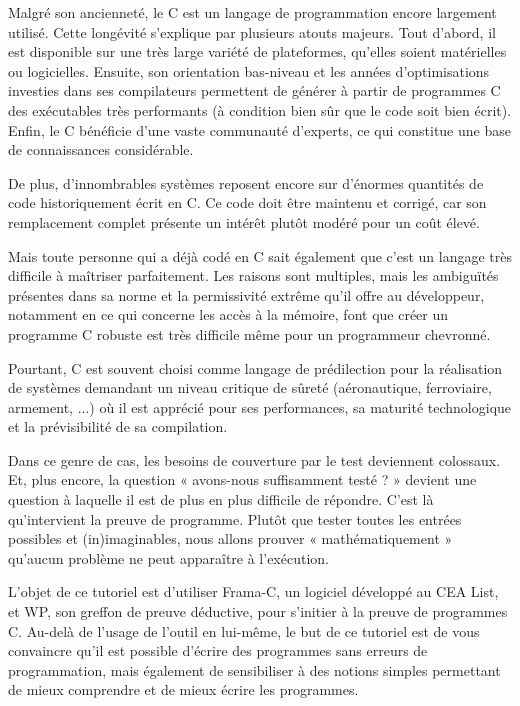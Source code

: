 \newpage


Malgré son ancienneté, le C est un langage de programmation encore largement
utilisé.  Cette longévité s’explique par plusieurs atouts majeurs. Tout d’abord,
il est disponible sur une très large variété de plateformes, qu’elles soient
matérielles ou logicielles. Ensuite, son orientation bas-niveau et les années
d'optimisations investies dans ses compilateurs permettent de générer à
partir de programmes C des exécutables très performants (à condition bien sûr
que le code soit bien écrit). Enfin, le C bénéficie d’une vaste communauté
d’experts, ce qui constitue une base de connaissances considérable.



De plus, d’innombrables systèmes reposent encore sur d’énormes quantités de code
historiquement écrit en C. Ce code doit être maintenu et corrigé, car son
remplacement complet présente un intérêt plutôt modéré pour un coût élevé.



Mais toute personne qui a déjà codé en C sait également que c'est un langage
très difficile à maîtriser parfaitement. Les raisons sont multiples, mais les
ambiguïtés présentes dans sa norme et la permissivité extrême qu'il offre au
développeur, notamment en ce qui concerne les accès à la mémoire, font que
créer un programme C robuste est très difficile même pour un programmeur
chevronné.



Pourtant, C est souvent choisi comme langage de prédilection pour la
réalisation de systèmes demandant un niveau critique de sûreté (aéronautique,
ferroviaire, armement, ...) où il est apprécié pour ses performances, sa
maturité technologique et la prévisibilité de sa compilation.



Dans ce genre de cas, les besoins de couverture par le test deviennent
colossaux. Et, plus encore, la question « avons-nous suffisamment testé ? »
devient une question à laquelle il est de plus en plus difficile de répondre.
C'est là qu'intervient la preuve de programme. Plutôt que tester toutes les
entrées possibles et (in)imaginables, nous allons prouver « mathématiquement »
qu'aucun problème ne peut apparaître à l'exécution.



L'objet de ce tutoriel est d'utiliser Frama-C, un logiciel développé au
CEA List, et WP, son greffon de preuve déductive, pour s'initier à la preuve
de programmes C. Au-delà de l'usage de l'outil en lui-même, le but de ce tutoriel
est de vous convaincre qu'il est possible d'écrire des programmes sans erreurs de
programmation, mais également de sensibiliser à des notions simples
permettant de mieux comprendre et de mieux écrire les programmes.



